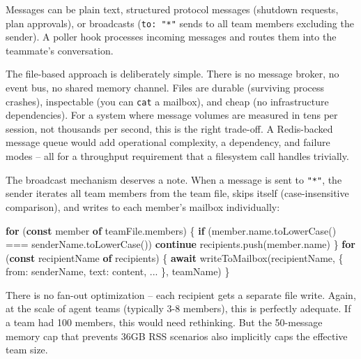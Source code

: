 \documentclass[
  english,
  11pt,
  letterpaper,
]{book}
\newenvironment{Shaded}{\begin{snugshade}}{\end{snugshade}}
\newcommand{\AttributeTok}[1]{\textcolor[rgb]{0.40,0.45,0.13}{#1}}
\newcommand{\ControlFlowTok}[1]{\textcolor[rgb]{0.00,0.23,0.31}{\textbf{#1}}}
\newcommand{\FunctionTok}[1]{\textcolor[rgb]{0.28,0.35,0.67}{#1}}
\newcommand{\KeywordTok}[1]{\textcolor[rgb]{0.00,0.23,0.31}{\textbf{#1}}}
\newcommand{\NormalTok}[1]{\textcolor[rgb]{0.00,0.23,0.31}{#1}}
\newcommand{\OperatorTok}[1]{\textcolor[rgb]{0.37,0.37,0.37}{#1}}
\begin{document}
Messages can be plain text, structured protocol messages (shutdown
requests, plan approvals), or broadcasts (\texttt{to:\ "*"} sends to all
team members excluding the sender). A poller hook processes incoming
messages and routes them into the teammate's conversation.

The file-based approach is deliberately simple. There is no message
broker, no event bus, no shared memory channel. Files are durable
(surviving process crashes), inspectable (you can \texttt{cat} a
mailbox), and cheap (no infrastructure dependencies). For a system where
message volumes are measured in tens per session, not thousands per
second, this is the right trade-off. A Redis-backed message queue would
add operational complexity, a dependency, and failure modes -- all for a
throughput requirement that a filesystem call handles trivially.

The broadcast mechanism deserves a note. When a message is sent to
\texttt{"*"}, the sender iterates all team members from the team file,
skips itself (case-insensitive comparison), and writes to each member's
mailbox individually:

\begin{Shaded}
\begin{Highlighting}[]
\ControlFlowTok{for}\NormalTok{ (}\KeywordTok{const}\NormalTok{ member }\KeywordTok{of}\NormalTok{ teamFile}\OperatorTok{.}\AttributeTok{members}\NormalTok{) \{}
  \ControlFlowTok{if}\NormalTok{ (member}\OperatorTok{.}\AttributeTok{name}\OperatorTok{.}\FunctionTok{toLowerCase}\NormalTok{() }\OperatorTok{===}\NormalTok{ senderName}\OperatorTok{.}\FunctionTok{toLowerCase}\NormalTok{()) }\ControlFlowTok{continue}
\NormalTok{  recipients}\OperatorTok{.}\FunctionTok{push}\NormalTok{(member}\OperatorTok{.}\AttributeTok{name}\NormalTok{)}
\NormalTok{\}}
\ControlFlowTok{for}\NormalTok{ (}\KeywordTok{const}\NormalTok{ recipientName }\KeywordTok{of}\NormalTok{ recipients) \{}
  \ControlFlowTok{await} \FunctionTok{writeToMailbox}\NormalTok{(recipientName}\OperatorTok{,}\NormalTok{ \{ from}\OperatorTok{:}\NormalTok{ senderName}\OperatorTok{,}\NormalTok{ text}\OperatorTok{:}\NormalTok{ content}\OperatorTok{,} \OperatorTok{...}\NormalTok{ \}}\OperatorTok{,}\NormalTok{ teamName)}
\NormalTok{\}}
\end{Highlighting}
\end{Shaded}

There is no fan-out optimization -- each recipient gets a separate file
write. Again, at the scale of agent teams (typically 3-8 members), this
is perfectly adequate. If a team had 100 members, this would need
rethinking. But the 50-message memory cap that prevents 36GB RSS
scenarios also implicitly caps the effective team size.
\end{document}
